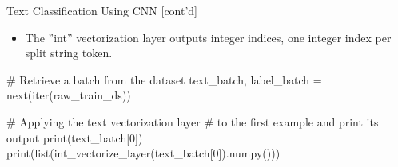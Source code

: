 \documentclass[ignorenonframetext,xcolor=x11names]{beamer}
\begin{document}
\begin{frame}[fragile]{Text Classification Using CNN \small [cont'd]}
\begin{itemize}
   \item The ''int'' vectorization layer outputs integer indices, one integer index per split string token. 
\end{itemize}

\begin{pythoncode}
# Retrieve a batch from the dataset
text_batch, label_batch = next(iter(raw_train_ds))

# Applying the text vectorization layer 
# to the first example and print its output
print(text_batch[0])
print(list(int_vectorize_layer(text_batch[0]).numpy()))
\end{pythoncode}
\end{frame}
\end{document}
